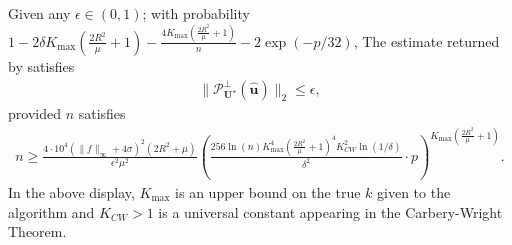 \documentclass[final,12pt]{colt2018} %
\renewcommand\v[1]{{\ensuremath{\boldsymbol{#1}}}}
\begin{document}
\begin{theorem}
\label{theorem: multi_index_algo_analysis_restated}
Given any $\epsilon \in (0,1)$; with probability $1-2\delta K_\text{max} \left(\frac{2R^2}{\mu} + 1 \right)-\frac{4K_\text{max} \left(\frac{2R^2}{\mu} + 1\right)}{n}-2\exp(-p/32)$, The estimate returned by  satisfies
\begin{align*}
   \| \mathcal{P}^\perp_{\mathcal{\v U}^\star} (\hat{\v u}) \|_2 \leq \epsilon,
\end{align*}
provided $n$ satisfies 
\begin{align*}
    n \geq \frac{4\cdot 10^4(\|f\|_\infty + 4\sigma)^2 (2R^2 + \mu)}{\epsilon^2 \mu^2} \left( \frac{256 \ln(n)K_\text{max}^4\left( \frac{2R^2}{\mu} + 1\right)^4K_{CW}^2 \ln(1/\delta)}{\delta^2} \cdot p  \right)^{K_\text{max}\left(\frac{2R^2}{\mu}+1\right)}.
\end{align*}
In the above display, $K_\text{max}$ is an upper bound on the true $k$ given to the algorithm and $K_{CW}>1$ is a universal constant appearing in the Carbery-Wright Theorem. 
\end{theorem}
\end{document}
